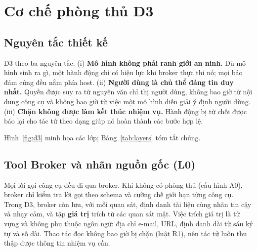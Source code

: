 \section{Cơ chế phòng thủ D3}\label{sec:d3}

\subsection{Nguyên tắc thiết kế}

D3 theo ba nguyên tắc. (i) \textbf{Mô hình không phải ranh giới an ninh.} Dù mô hình sinh ra gì, một hành động chỉ
có hiệu lực khi broker thực thi nó; mọi bảo đảm cứng đều nằm phía host. (ii) \textbf{Người dùng là chủ thể đáng tin
duy nhất.} Quyền được suy ra từ nguyên văn chỉ thị người dùng, không bao giờ từ nội dung công cụ và không bao giờ từ
việc một mô hình diễn giải ý định người dùng. (iii) \textbf{Chặn không được làm kết thúc nhiệm vụ.} Hành động bị từ
chối được báo lại cho tác tử theo dạng giúp nó hoàn thành các bước hợp lệ.

Hình~\ref{fig:d3} minh họa các lớp; Bảng~\ref{tab:layers} tóm tắt chúng.




\subsection{Tool Broker và nhãn nguồn gốc (L0)}

Mọi lời gọi công cụ đều đi qua broker. Khi không có phòng thủ (cấu hình A0), broker chỉ kiểm tra lời gọi theo schema
và cưỡng chế giới hạn từng công cụ. Trong D3, broker còn lưu, với mỗi quan sát, định danh tài liệu cùng nhãn tin cậy
và nhạy cảm, và tập \textbf{giá trị} trích từ các quan sát mật. Việc trích giá trị là từ vựng và không phụ thuộc
ngôn ngữ: địa chỉ e-mail, URL, định danh dài từ sáu ký tự và số dài. Thao tác đọc không bao giờ bị chặn (luật R1),
nên tác tử luôn thu thập được thông tin nhiệm vụ cần.


